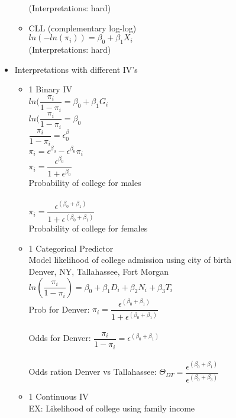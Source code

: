 \documentclass[12 pt]{article}
\begin{document}
\begin{itemize}
\begin{itemize}
                (Interpretations: hard)
            \item CLL (complementary log-log)\\
                $ ln(-ln(\pi_i)) = \beta_0 + \beta_1 X_i  $\\
                (Interpretations: hard)
        \end{itemize}
    \item Interpretations with different IV's
        \begin{itemize}
            \item 1 Binary IV \\
            $ ln(\dfrac{\pi_i}{1-\pi_i}=\beta_0 + \beta_1 G_i$\\
            $ ln(\dfrac{\pi_i}{1-\pi_i}=\beta_0$\\
            $ \dfrac{\pi_i}{1-\pi_i} = \epsilon^\beta_0$\\
            $ \pi_i = \epsilon^{\beta_0} - \epsilon^{\beta_0} \pi_i$\\
            $ \pi_i = \dfrac{\epsilon^{\beta_0}}{1+\epsilon^{\beta_0}}$\\
            Probability of college for males\\\\
            $ \pi_i = \dfrac{\epsilon^{(\beta_0 + \beta_1)}}{1+\epsilon^{(\beta_0 + \beta_1)} }$\\
            Probability of college for females
            \item 1 Categorical Predictor \\
            Model likelihood of college admission using city of birth\\
            {Denver, NY, Tallahassee, Fort Morgan}\\
            $ln(\dfrac{\pi_i}{1-\pi_i}) = \beta_0 + \beta_1 D_i + \beta_2 N_i + \beta_3 T_i$\\
            Prob for Denver: $ \pi_i = \dfrac{\epsilon^{(\beta_0 + \beta_1)}}{1 + \epsilon^{(\beta_0 + \beta_1)}}$\\\\
            Odds for Denver: $\dfrac{\pi_i}{1-\pi_i} = \epsilon ^{(\beta_0 + \beta_1)} $\\\\
            Odds ration Denver vs Tallahassee: $ \Theta_{DT} = \dfrac{\epsilon ^{(\beta_0 + \beta_1)}}{\epsilon ^{(\beta_0 + \beta_3)}} $
            \item 1 Continuous IV\\
            EX: Likelihood of college using family income\\

\end{itemize}
\end{itemize}
\end{document}
